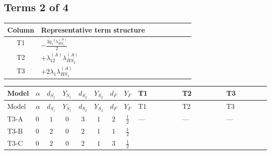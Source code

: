 \documentclass[8pt]{article}
\begin{document}
\begin{landscape}
\subsection*{Terms 2 of 4}
\begin{center}
\begin{tabular}{@{}c >{\raggedright\arraybackslash}p{0.82\linewidth}@{}}
\toprule
Column & Representative term structure \\
\midrule
T1 & \(\displaystyle -\frac{3 {g_1}^2 {\lambda_{HS_1}^{(A)}}}{2}\) \\
\midrule
T2 & \(\displaystyle +{\lambda_{12}^{(A)}} {\lambda_{HS_2}^{(A)}}\) \\
\midrule
T3 & \(\displaystyle +2 {\lambda_1} {\lambda_{HS_1}^{(A)}}\) \\
\midrule
\bottomrule
\end{tabular}
\end{center}
\smallskip
\tiny
\begin{longtable}{@{}llcccccc >{\raggedright\arraybackslash}p{0.21\linewidth} >{\raggedright\arraybackslash}p{0.21\linewidth} >{\raggedright\arraybackslash}p{0.21\linewidth}@{}}
\toprule
Model & $\alpha$ & $d_{S_1}$ & $Y_{S_1}$ & $d_{S_2}$ & $Y_{S_2}$ & $d_F$ & $Y_F$ & T1 & T2 & T3 \\
\midrule
\endfirsthead
\toprule
Model & $\alpha$ & $d_{S_1}$ & $Y_{S_1}$ & $d_{S_2}$ & $Y_{S_2}$ & $d_F$ & $Y_F$ & T1 & T2 & T3 \\
\midrule
\endhead
T3-A & $0$ & $1$ & $0$ & $3$ & $1$ & $2$ & $\frac{1}{2}$ & --- & --- & --- \\
\midrule
T3-B & $0$ & $2$ & $0$ & $2$ & $1$ & $1$ & $\frac{1}{2}$ & \scriptsize\adjustbox{max width=\linewidth}{$\begin{gathered} -\frac{3 {g_1}^2 {\lambda_{HS_1}^{(A)}}}{2}\end{gathered}$} & \scriptsize\adjustbox{max width=\linewidth}{$\begin{gathered} +{\lambda_{12}^{(A)}} {\lambda_{HS_2}^{(A)}}\end{gathered}$} & \scriptsize\adjustbox{max width=\linewidth}{$\begin{gathered} +2 {\lambda_1} {\lambda_{HS_1}^{(A)}}\end{gathered}$} \\
\midrule
T3-C & $0$ & $2$ & $0$ & $2$ & $1$ & $3$ & $\frac{1}{2}$ & \scriptsize\adjustbox{max width=\linewidth}{$\begin{gathered} -\frac{3 {g_1}^2 {\lambda_{HS_1}^{(A)}}}{2}\end{gathered}$} & \scriptsize\adjustbox{max width=\linewidth}{$\begin{gathered} +{\lambda_{12}^{(A)}} {\lambda_{HS_2}^{(A)}}\end{gathered}$} & \scriptsize\adjustbox{max width=\linewidth}{$\begin{gathered} +2 {\lambda_1} {\lambda_{HS_1}^{(A)}}\end{gathered}$} \\

\end{longtable}
\end{landscape}
\end{document}
